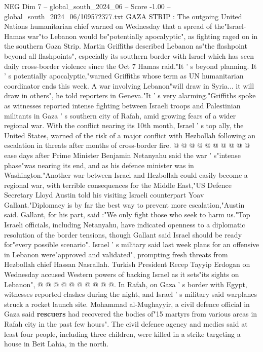 \begin{textsample}{NEG Dim 7 – global\_south\_2024\_06 – Score -1.00 – global\_south\_2024\_06/109572377.txt}  \label{ex:f7_neg_210}
GAZA STRIP : The outgoing United Nations humanitarian chief warned on Wednesday that a spread of the"Israel-Hamas war"to Lebanon would be"potentially apocalyptic", as fighting raged on in the southern Gaza Strip.
Martin Griffiths described Lebanon as"the flashpoint beyond all flashpoints", especially its southern border with Israel which has seen daily cross-border violence since the Oct 7 Hamas raid."It ' s beyond planning.
It ' s potentially apocalyptic,"warned Griffiths whose term as UN humanitarian coordinator ends this week.
A war involving Lebanon"will draw in Syria... it will draw in others", he told reporters in Geneva."It ' s very alarming."Griffiths spoke as witnesses reported intense fighting between Israeli troops and Palestinian militants in Gaza ' s southern city of Rafah, amid growing fears of a wider regional war.
With the conflict nearing its 10th month, Israel ' s top ally, the United States, warned of the risk of a major conflict with Hezbollah following an escalation in threats after months of cross-border fire. @ @ @ @ @ @ @ @ @ @ ease days after Prime Minister Benjamin Netanyahu said the war ' s"intense phase"was nearing its end, and as his defence minister was in Washington."Another war between Israel and Hezbollah could easily become a regional war, with terrible consequences for the Middle East,"US Defence Secretary Lloyd Austin told his visiting Israeli counterpart Yoav Gallant."Diplomacy is by far the best way to prevent more escalation,"Austin said.
Gallant, for his part, said :"We only fight those who seek to harm us."Top Israeli officials, including Netanyahu, have indicated openness to a diplomatic resolution of the border tensions, though Gallant said Israel should be ready for"every possible scenario".
Israel ' s military said last week plans for an offensive in Lebanon were"approved and validated", prompting fresh threats from Hezbollah chief Hassan Nasrallah.
Turkish President Recep Tayyip Erdogan on Wednesday accused Western powers of backing Israel as it sets"its sights on Lebanon", @ @ @ @ @ @ @ @ @ @.
In Rafah, on Gaza ' s border with Egypt, witnesses reported clashes during the night, and Israel ' s military said warplanes struck a rocket launch site.
Mohammad al-Mughayyir, a civil defence official in Gaza said \textbf{rescuers} had recovered the bodies of"15 martyrs from various areas in Rafah city in the past few hours".
The civil defence agency and medics said at least four people, including three children, were killed in a strike targeting a house in Beit Lahia, in the north.

\end{textsample}
